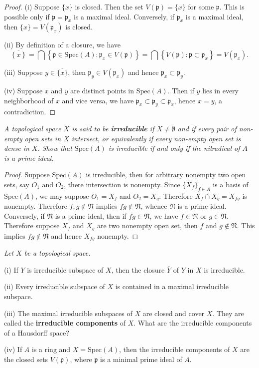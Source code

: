\begin{proof}
(i) Suppose $\{x\}$ is closed. Then the set $V(\mathfrak{p})=\{x\}$ for some $\mathfrak{p}$. This is possible only if $\mathfrak{p}=\mathfrak{p}_x$ is a maximal ideal. Conversely, if $\mathfrak{p}_x$ is a maximal ideal, then $\{x\}=V(\mathfrak{p}_x)$ is closed.\par
(ii) By definition of a closure, we have 
$$
\overline{\left\{ x \right\} }=\bigcap{\left\{ \mathfrak{p} \in \mathrm{Spec}\left( A \right) :\mathfrak{p} _x\in V\left( \mathfrak{p} \right) \right\}}=\bigcap{\left\{ V\left( \mathfrak{p} \right) :\mathfrak{p} \subset \mathfrak{p} _x \right\}}=V\left( \mathfrak{p} _x \right) .
$$\par
(iii) Suppose $y\in\overline{\{x\}}$, then $\mathfrak{p}_y\in V(\mathfrak{p}_x)$ and hence $\mathfrak{p}_x\subset\mathfrak{p}_y$.\par
(iv) Suppose $x$ and $y$ are distinct points in $\mathrm{Spec}(A)$. Then if $y$ lies in every neighborhood of $x$ and vice versa, we have $\mathfrak{p}_x\subset\mathfrak{p}_y\subset\mathfrak{p}_x$, hence $x=y$, a contradiction.
\end{proof}
\begin{problem}\em
A topological space $X$ is said to be \textbf{irreducible} if $X\ne\emptyset$ and if every pair of non-empty open sets in $X$ intersect, or equivalently if every non-empty open set is dense in $X$. Show that $\mathrm{Spec}(A)$ is irreducible if and only if the nilradical of $A$ is a prime ideal.
\end{problem}
\begin{proof}
Suppose $\mathrm{Spec}(A)$ is irreducible, then for arbitrary nonempty two open sets, say $O_1$ and $O_2$, there intersection is nonempty. Since $\{X_f\}_{f\in A}$ is a basis of $\mathrm{Spec}(A)$, we may suppose $O_1=X_f$ and $O_2=X_g$. Therefore $X_f\cap X_g=X_{fg}$ is nonempty. Therefore $f,g\notin\mathfrak{N}$ implies $fg\notin\mathfrak{N}$, whence $\mathfrak{N}$ is a prime ideal. Conversely, if $\mathfrak{N}$ is a prime ideal, then if $fg\in\mathfrak{N}$, we have $f\in\mathfrak{N}$ or $g\in\mathfrak{N}$. Therefore suppose $X_f$ and $X_g$ are two nonempty open set, then $f$ and $g\notin\mathfrak{N}$. This implies $fg\notin\mathfrak{N}$ and hence $X_{fg}$ nonempty.
\end{proof}
\begin{problem}\em
Let $X$ be a topological space.\par
(i) If $Y$ is irreducible subspace of $X$, then the closure $\overline{Y}$ of $Y$ in $X$ is irreducible. \par
(ii) Every irreducible subspace of $X$ is contained in a maximal irreducible subspace. \par
(iii) The maximal irreducible subspaces of $X$ are closed and cover $X$. They are called the \textbf{irreducible components} of $X$. What are the irreducible components of a Hausdorff space?\par
(iv) If $A$ is a ring and $X=\mathrm{Spec}(A)$, then the irreducible components of $X$ are the closed sets $V(\mathfrak{p})$, where $\mathfrak{p}$ is a minimal prime ideal of $A$.
\end{problem}
